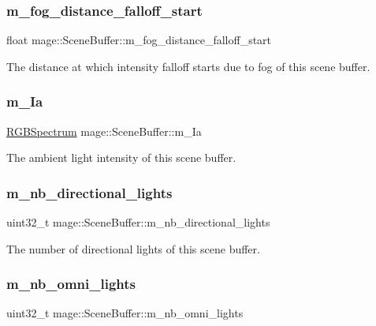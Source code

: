 \subsubsection{\texorpdfstring{m\+\_\+fog\+\_\+distance\+\_\+falloff\+\_\+start}{m\_fog\_distance\_falloff\_start}}
{\footnotesize\ttfamily float mage\+::\+Scene\+Buffer\+::m\+\_\+fog\+\_\+distance\+\_\+falloff\+\_\+start}

The distance at which intensity falloff starts due to fog of this scene buffer. \hypertarget{structmage_1_1_scene_buffer_aea665fc44e954da899b97ec66e136c06}{}\label{structmage_1_1_scene_buffer_aea665fc44e954da899b97ec66e136c06} 
\subsubsection{\texorpdfstring{m\+\_\+\+Ia}{m\_Ia}}
{\footnotesize\ttfamily \hyperlink{structmage_1_1_r_g_b_spectrum}{R\+G\+B\+Spectrum} mage\+::\+Scene\+Buffer\+::m\+\_\+\+Ia}

The ambient light intensity of this scene buffer. \hypertarget{structmage_1_1_scene_buffer_ae3274b43175f1724c1923f0d5d51dfdf}{}\label{structmage_1_1_scene_buffer_ae3274b43175f1724c1923f0d5d51dfdf} 
\subsubsection{\texorpdfstring{m\+\_\+nb\+\_\+directional\+\_\+lights}{m\_nb\_directional\_lights}}
{\footnotesize\ttfamily uint32\+\_\+t mage\+::\+Scene\+Buffer\+::m\+\_\+nb\+\_\+directional\+\_\+lights}

The number of directional lights of this scene buffer. \hypertarget{structmage_1_1_scene_buffer_a30b77b7124d180c2168c8bc0e84243d3}{}\label{structmage_1_1_scene_buffer_a30b77b7124d180c2168c8bc0e84243d3} 
\subsubsection{\texorpdfstring{m\+\_\+nb\+\_\+omni\+\_\+lights}{m\_nb\_omni\_lights}}
{\footnotesize\ttfamily uint32\+\_\+t mage\+::\+Scene\+Buffer\+::m\+\_\+nb\+\_\+omni\+\_\+lights}

